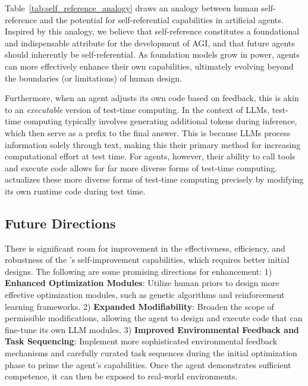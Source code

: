 
Table~\ref{tab:self_reference_analogy} draws an analogy between human self-reference and the potential for self-referential capabilities in artificial agents. 
Inspired by this analogy, we believe that self-reference constitutes a foundational and indispensable attribute for the development of AGI, and that future agents should inherently be self-referential.
As foundation models grow in power, agents can more effectively enhance their own capabilities, ultimately evolving beyond the boundaries (or limitations) of human design.

Furthermore, when an agent adjusts its own code based on feedback, this is akin to an \textit{executable} version of test-time computing. In the context of LLMs, test-time computing typically involves generating additional tokens during inference, which then serve as a prefix to the final answer. This is because LLMs process information solely through text, making this their primary method for increasing computational effort at test time. For agents, however, their ability to call tools and execute code allows for far more diverse forms of test-time computing. \framework{} actualizes these more diverse forms of test-time computing precisely by modifying its own runtime code during test time.


\subsection{Future Directions}




There is significant room for improvement in the effectiveness, efficiency, and robustness of the \framework{}'s self-improvement capabilities, which requires better initial designs. The following are some promising directions for enhancement:
1) \textbf{Enhanced Optimization Modules}: Utilize human priors to design more effective optimization modules, such as genetic algorithms and reinforcement learning frameworks.
2) \textbf{Expanded Modifiability}: Broaden the scope of permissible modifications, allowing the agent to design and execute code that can fine-tune its own LLM modules.
3) \textbf{Improved Environmental Feedback and Task Sequencing}: Implement more sophisticated environmental feedback mechanisms and carefully curated task sequences during the initial optimization phase to prime the agent's capabilities. Once the agent demonstrates sufficient competence, it can then be exposed to real-world environments.




